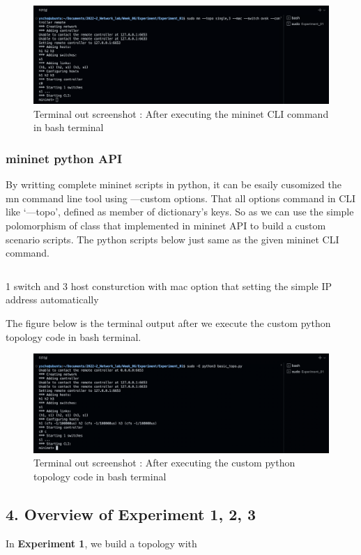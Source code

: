 \vspace{-4mm}
\begin{figure}[!h]\centering 
	\includegraphics[width=.9\textwidth]{image/week06/1-3-1.png}
	\caption{\footnotesize 
	Terminal out screenshot : After executing the mininet CLI command in bash terminal}
	\vspace{-10pt}
\end{figure}
\vspace{-4mm}
\subsubsection*{mininet python API}
By writting complete mininet scripts in python, it can be esaily cusomized the mn command line tool using —custom options. That all options command in CLI like ‘—topo’, defined as member of dictionary’s keys. 
So as we can use the simple polomorphism of class that implemented in mininet API to build a custom scenario scripts.
The python scripts below just same as the given mininet CLI command.
\begin{listing}[h!]
\inputminted[framerule = 1pt,framesep = 2mm , frame = lines, fontsize=\scriptsize]{python}{./code/week06/basic_topo.py}
\caption{\footnotesize 1 switch and 3 host consturction with mac option that setting the simple IP address automatically}
\end{listing}
\clearpage
The figure below is the terminal output after we execute the custom python topology code in bash terminal.\\
\vspace{-4mm}
\begin{figure}[!h]\centering 
	\includegraphics[width=.9\textwidth]{image/week06/1-3-2.png}
	\caption{\footnotesize 
	Terminal out screenshot : After executing the custom python topology code in bash terminal}
	\vspace{-10pt}
\end{figure}
\subsection*{4. Overview of Experiment 1, 2, 3}
In \textbf{Experiment 1}, we build a topology with 
\clearpage